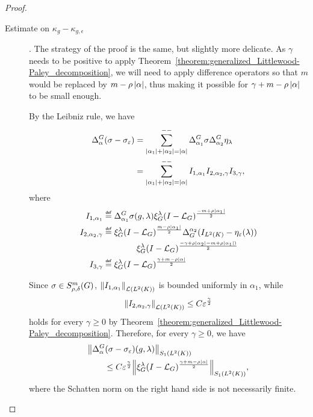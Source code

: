 \begin{proof}
\begin{description}
        \item[Estimate on $\kappa_g - \kappa_{g, \epsilon}$].
            The strategy of the proof is the same,
            but slightly more delicate.
            As $\gamma$ needs to be positive to apply Theorem~\ref{theorem:generalized_Littlewood-Paley_decomposition},
            we will need to apply difference operators so that $m$ would be replaced by $m - \rho \abs \alpha$,
            thus making it possible for $\gamma + m - \rho \abs \alpha$ to be small enough.

            By the Leibniz rule,
            we have
            \begin{align*}
                \DifferenceOperator \alpha (\sigma - \sigma_\epsilon)
                &= \lcsum{\abs {\alpha_1} + \abs {\alpha_2} = \abs \alpha}
                \DifferenceOperator {\alpha_1} \sigma \DifferenceOperator {\alpha_2} \eta_\lambda\\
                &= \lcsum{\abs {\alpha_1} + \abs {\alpha_2} = \abs \alpha}
                I_{1, \alpha_1} I_{2, \alpha_2, \gamma} I_{3, \gamma},
            \end{align*}
            where
            \begin{align*}
                I_{1, \alpha_1} &\defeq \DifferenceOperator {\alpha_1} \sigma(g, \lambda) \Rep \lambda \BesselPotential {-m + \rho \abs {\alpha_1}}\\
                I_{2, \alpha_2, \gamma} &\defeq \Rep \lambda \BesselPotential {m - \rho \abs {\alpha_1}} \DifferenceOperatorOrder {\alpha_2} (\Id {\Lebesgue 2 \CompactGroup} - \eta_\epsilon(\lambda))\\
                &\qquad \qquad\Rep \lambda \BesselPotential {-\gamma + \rho \abs {\alpha_2} - m + \rho \abs {\alpha_1})}\\
                I_{3, \gamma} &\defeq \Rep \lambda \BesselPotential {\gamma + m - \rho \abs \alpha}
            \end{align*}

            Since $\sigma \in \SymbolClass m {\rho, \delta}$,
            $\norm [\Lin {\Lebesgue 2 \CompactGroup}] {I_{1, \alpha_1}}$ is bounded uniformly in $\alpha_1$,
            while
            \begin{align*}
                \norm [\Lin {\Lebesgue 2 \CompactGroup}] {I_{2, \alpha_2, \gamma}}
                \leq C \epsilon^\frac \gamma 2
            \end{align*}
            holds for every $\gamma \geq 0$ by Theorem~\ref{theorem:generalized_Littlewood-Paley_decomposition}.
            Therefore, for every $\gamma \geq 0$, we have
            \begin{align*}
                &\norm [\SchattenClasses 1 {\Lebesgue 2 \CompactGroup}] {\DifferenceOperator \alpha (\sigma - \sigma_\epsilon)(g, \lambda)}\\
                & \qquad \leq C \epsilon^\frac \gamma 2
                \norm [\SchattenClasses 1 {\Lebesgue 2 \CompactGroup}] {\Rep \lambda \BesselPotential {\gamma + m - \rho \abs \alpha}},
            \end{align*}
            where the Schatten norm on the right hand side is not necessarily finite.


\end{description}
\end{proof}
